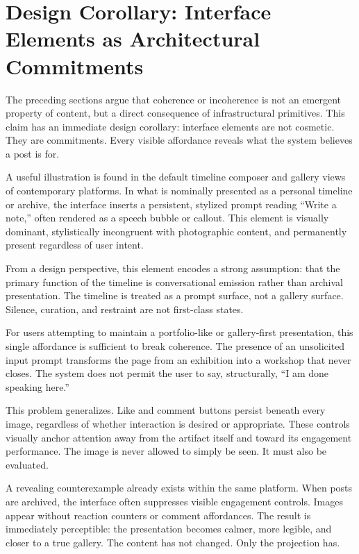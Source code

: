 \documentclass[11pt,oneside]{article}
\begin{document}
\section{Design Corollary: Interface Elements as Architectural Commitments}

The preceding sections argue that coherence or incoherence is not an emergent property of content, but a direct consequence of infrastructural primitives. This claim has an immediate design corollary: interface elements are not cosmetic. They are commitments. Every visible affordance reveals what the system believes a post is for.

A useful illustration is found in the default timeline composer and gallery views of contemporary platforms. In what is nominally presented as a personal timeline or archive, the interface inserts a persistent, stylized prompt reading “Write a note,” often rendered as a speech bubble or callout. This element is visually dominant, stylistically incongruent with photographic content, and permanently present regardless of user intent.

From a design perspective, this element encodes a strong assumption: that the primary function of the timeline is conversational emission rather than archival presentation. The timeline is treated as a prompt surface, not a gallery surface. Silence, curation, and restraint are not first-class states.

For users attempting to maintain a portfolio-like or gallery-first presentation, this single affordance is sufficient to break coherence. The presence of an unsolicited input prompt transforms the page from an exhibition into a workshop that never closes. The system does not permit the user to say, structurally, “I am done speaking here.”

This problem generalizes. Like and comment buttons persist beneath every image, regardless of whether interaction is desired or appropriate. These controls visually anchor attention away from the artifact itself and toward its engagement performance. The image is never allowed to simply be seen. It must also be evaluated.

A revealing counterexample already exists within the same platform. When posts are archived, the interface often suppresses visible engagement controls. Images appear without reaction counters or comment affordances. The result is immediately perceptible: the presentation becomes calmer, more legible, and closer to a true gallery. The content has not changed. Only the projection has.
\end{document}
